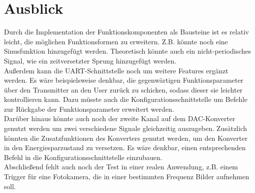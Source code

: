 \chapter{Ausblick}
Durch die Implementation der Funktionskomponenten als Bausteine ist es relativ leicht, die möglichen Funktionsformen zu erweitern.
Z.B. könnte noch eine Sinusfunktion hinzugefügt werden.
Theoretisch könnte auch ein nicht-periodisches Signal, wie ein zeitversetzter Sprung hinzugefügt werden.\\
Außerdem kann die UART-Schnittstelle noch um weitere Features ergänzt werden.
Es wäre beispielsweise denkbar, die gegenwärtigen Funktionsparameter über den Transmitter an den User zurück zu schicken, sodass dieser sie leichter kontrollieren kann.
Dazu müsste auch die Konfigurationsschnittstelle um Befehle zur Rückgabe der Funktionsparameter erweitert werden. \\
Darüber hinaus könnte auch noch der zweite Kanal auf dem DAC-Konverter genutzt werden um zwei verschiedene Signale gleichzeitig auszugeben.
Zusätzlich könnten die Zusatzfunktionen des Konverters genutzt werden, um den Konverter in den Energiesparzustand zu versetzen.
Es wäre denkbar, einen entsprechenden Befehl in die Konfigurationsschnittstelle einzubauen. \\
Abschließend fehlt auch noch der Test in einer realen Anwendung, z.B. einem Trigger für eine Fotokamera, die in einer bestimmten Frequenz Bilder aufnehmen soll.